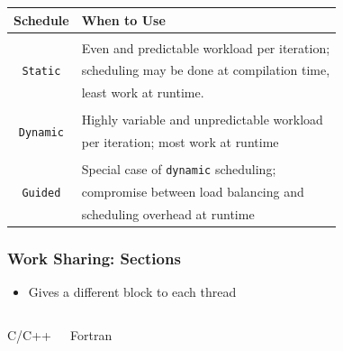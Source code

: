 \documentclass[c,mathserif,compress,xcolor=svgnames]{beamer}
\newenvironment{bblock}[0]
{
\begin{beamerboxesrounded}[upper=uppercol1,lower=lowercol1,shadow=true]}
{\end{beamerboxesrounded}}
\newenvironment{eblock}[0]
{
\begin{beamerboxesrounded}[upper=uppercol2,lower=lowercol2,shadow=true]}
{\end{beamerboxesrounded}}
\begin{document}
\begin{frame}[allowframebreaks]
  \begin{bblock}{}
    \begin{center}
      \begin{tabular}{cl}
        Schedule & When to Use \\
        \hline\\
        \multirow{3}{*}{\texttt{Static}} & Even and predictable workload per iteration; \\
        & scheduling may be done at compilation time,\\ 
        & least work at runtime.\\
        \\
        \multirow{2}{*}{\texttt{Dynamic}} & Highly variable and unpredictable workload \\
        & per iteration; most work at runtime \\
        \\
        \multirow{3}{*}{\texttt{Guided}} & Special case of \texttt{dynamic} scheduling; \\
        & compromise between load balancing and \\
        & scheduling overhead at runtime \\
      \end{tabular}
    \end{center}
  \end{bblock}
\end{frame}

\begin{frame}[fragile]
  \frametitle{\small Work Sharing: Sections}
  \begin{itemize}
    \item Gives a different block to each thread
  \end{itemize}
  \begin{columns}
    \begin{eblock}{C/C++}
      
    \end{eblock}
    \begin{eblock}{Fortran}
      
    \end{eblock}
  \end{columns}
\end{frame}
\end{document}
